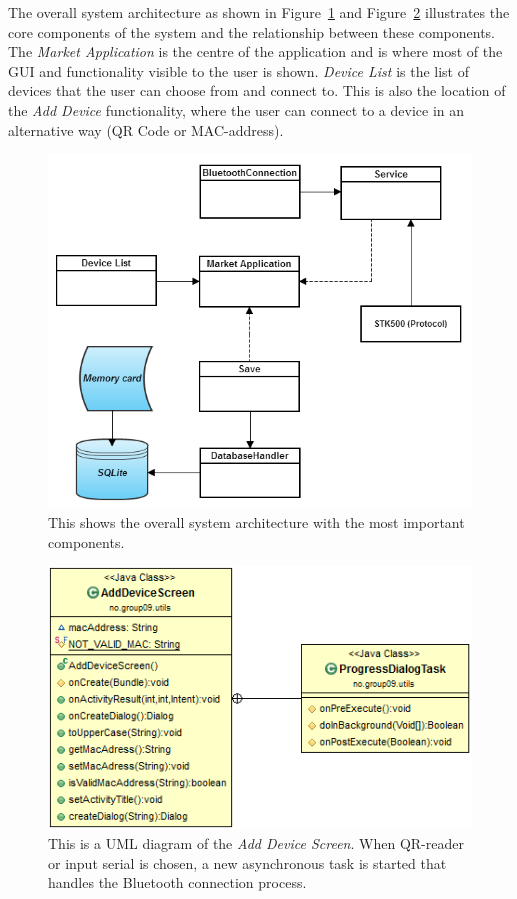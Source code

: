 	The overall system architecture as shown in Figure~\ref{fig:systemarchitecture} and Figure~\ref{fig:adddevicescreenuml} illustrates the core components of the system and the relationship between these components. The \textit{Market Application} is the centre of the application and is where most of the GUI and functionality visible to the user is shown. \textit{Device List} is the list of devices that the user can choose from and connect to. This is also the location of the \textit{Add Device} functionality, where the user can connect to a device in an alternative way (QR Code or MAC-address).\\

	\begin{figure}[H]
	\centering
	\includegraphics[scale=0.8]{images/System_architecture.png}
	\caption[System Architecture]{This shows the overall system architecture with the most important components.}
	\label{fig:systemarchitecture}
	\end{figure}

	\begin{figure}[H]
	\centering
	\includegraphics[scale=0.85]{images/UML/adddevicescreen.png}
	\caption[UML - AddDeviceScreen]{This is a UML diagram of the \textit{Add Device Screen}. When QR-reader or input serial is chosen, a new asynchronous task is started that handles the Bluetooth connection process.}
	\label{fig:adddevicescreenuml}
	\end{figure}

